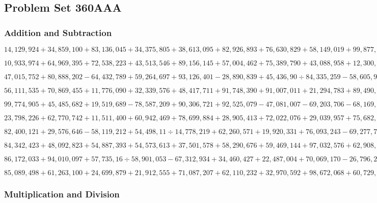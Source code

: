 \hypertarget{problem-set-360aaa}{%
\subsection{Problem Set 360AAA}\label{problem-set-360aaa}}

\hypertarget{addition-and-subtraction}{%
\subsubsection{Addition and
Subtraction}\label{addition-and-subtraction}}

\(14,129,924+34,859,100+83,136,045+34,375,805+38,613,095+82,926,893+76,630,829+58,149,019+99,877,698+38,251,091\)

\(10,933,974+64,969,395+72,538,223+43,513,546+89,156,145+57,004,462+75,389,790+43,088,958+12,300,931+42,571,873\)

\(47,015,752+80,888,202-64,432,789+59,264,697+93,126,401-28,890,839+45,436,90÷84,335,259-58,605,979+83,456,911\)

\(56,111,535+70,869,455+11,776,090+32,339,576+48,417,711+91,748,390+91,007,011+21,294,783+89,490,317+65,108,919\)

\(99,774,905+45,485,682+19,519,689-78,587,209+90,306,721+92,525,079-47,081,007-69,203,706-68,169,067+96,000,736\)

\(23,798,226+62,770,742+11,511,400+60,942,469+78,699,884+28,905,413+72,022,076+29,039,957+75,682,467+61,533,395\)

\(82,400,121+29,576,646-58,119,212+54,498,11÷14,778,219+62,260,571+19,920,331+76,093,243-69,277,750-23,433,259\)

\(84,342,423+48,092,823+54,887,393+54,573,613+37,501,578+58,290,676+59,469,144+97,032,576+62,908,790+53,292,811\)

\(86,172,033+94,010,097+57,735,16÷58,901,053-67,312,934+34,460,427+22,487,004+70,069,170-26,796,228-20,081,145\)

\(85,089,498+61,263,100+24,699,879+21,912,555+71,087,207+62,110,232+32,970,592+98,672,068+60,729,721+81,191,507\)

\hypertarget{multiplication-and-division}{%
\subsubsection{Multiplication and
Division}\label{multiplication-and-division}}


